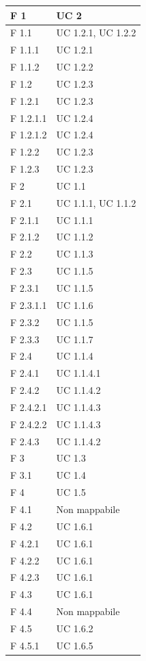 \documentclass[a4paper,11pt]{article}
\begin{document}
\begin{longtable}{p{}p{}}
F 1 & UC 2\\
\midrule
F 1.1 & UC 1.2.1, UC 1.2.2\\
\midrule
F 1.1.1 & UC 1.2.1\\
\midrule
F 1.1.2 & UC 1.2.2\\
\midrule
F 1.2 & UC 1.2.3\\
\midrule
F 1.2.1 & UC 1.2.3\\
\midrule
F 1.2.1.1 & UC 1.2.4\\
\midrule
F 1.2.1.2 & UC 1.2.4\\
\midrule
F 1.2.2 & UC 1.2.3\\
\midrule
F 1.2.3 & UC 1.2.3\\
\midrule
F 2 & UC 1.1\\
\midrule
F 2.1 & UC 1.1.1, UC 1.1.2\\
\midrule
F 2.1.1 & UC 1.1.1\\
\midrule
F 2.1.2 & UC 1.1.2\\
\midrule
F 2.2 & UC 1.1.3\\
\midrule
F 2.3 & UC 1.1.5\\
\midrule
F 2.3.1 & UC 1.1.5\\
\midrule
F 2.3.1.1 & UC 1.1.6\\
\midrule
F 2.3.2 & UC 1.1.5\\
\midrule
F 2.3.3 & UC 1.1.7\\
\midrule
F 2.4 & UC 1.1.4\\
\midrule
F 2.4.1 & UC 1.1.4.1\\
\midrule
F 2.4.2 & UC 1.1.4.2\\
\midrule
F 2.4.2.1 & UC 1.1.4.3\\
\midrule
F 2.4.2.2 & UC 1.1.4.3\\
\midrule
F 2.4.3 & UC 1.1.4.2\\
\midrule
F 3 & UC 1.3\\
\midrule
F 3.1 & UC 1.4\\
\midrule
F 4 & UC 1.5\\
\midrule
F 4.1 & Non mappabile\\
\midrule
F 4.2 & UC 1.6.1\\
\midrule
F 4.2.1 & UC 1.6.1\\
\midrule
F 4.2.2 & UC 1.6.1\\
\midrule
F 4.2.3 & UC 1.6.1\\
\midrule
F 4.3 & UC 1.6.1\\
\midrule
F 4.4 & Non mappabile\\
\midrule
F 4.5 & UC 1.6.2\\
\midrule
F 4.5.1 & UC 1.6.5\\

\end{longtable}
\end{document}
